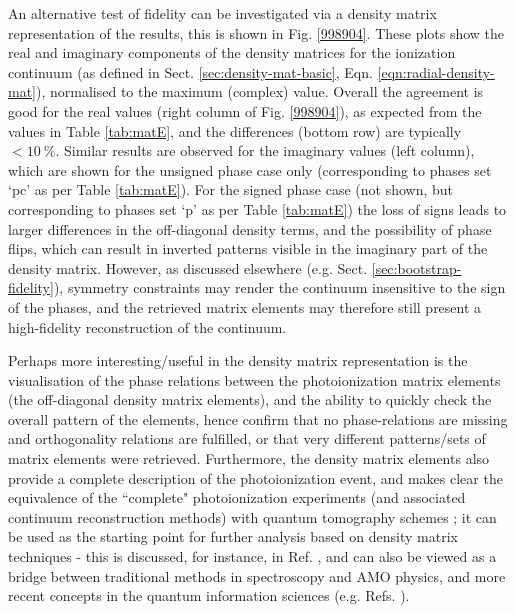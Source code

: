 \documentclass[10pt]{article}
\begin{document}
An alternative test of fidelity can be investigated via a density matrix representation of the results, this is shown in Fig. \ref{998904}. These plots show the real and imaginary components of the density matrices for the ionization continuum (as defined in Sect. \ref{sec:density-mat-basic}, Eqn. \ref{eqn:radial-density-mat}), normalised to the maximum (complex) value. Overall the agreement is good for the real values (right column of Fig. \ref{998904}), as expected from the values in Table \ref{tab:matE}, and the differences (bottom row) are typically $<10~\%$. Similar results are observed for the imaginary values (left column), which are shown for the unsigned phase case only (corresponding to phases set `pc' as per Table \ref{tab:matE}). For the signed phase case (not shown, but corresponding to phases set `p' as per Table \ref{tab:matE}) the loss of signs leads to larger differences in the off-diagonal density terms, and the possibility of phase flips, which 
can result in inverted patterns visible in the imaginary part of the density matrix. However, as discussed elsewhere (e.g. Sect. \ref{sec:bootstrap-fidelity}), symmetry constraints may render the continuum insensitive to the sign of the phases, and the retrieved matrix elements may therefore still present a high-fidelity reconstruction of the continuum.

Perhaps more interesting/useful in the density matrix representation is the visualisation of the phase relations between the photoionization matrix elements (the off-diagonal density matrix elements), and the ability to quickly check the overall pattern of the elements, hence confirm that no phase-relations are missing and orthogonality relations are fulfilled, or that very different patterns/sets of matrix elements were retrieved. Furthermore, the density matrix elements also provide a complete description of the photoionization event, and makes clear the equivalence of the ``complete" photoionization experiments (and associated continuum reconstruction methods) with quantum tomography schemes \cite{MauroDAriano2003}; it can be used as the starting point for further analysis based on density matrix techniques - this is discussed, for instance, in Ref. \cite{BlumDensityMat}, and can also be viewed as a bridge between traditional methods in spectroscopy and AMO physics, and more recent concepts in the quantum information sciences (e.g. Refs.  \cite{Tichy2011a,Yuen-Zhou2014}).
\end{document}
